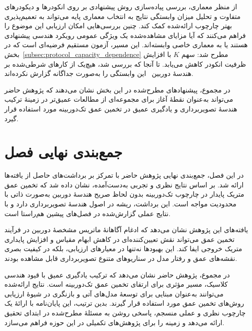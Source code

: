 از منظر معماری،
بررسی پیاده‌سازی روش پیشنهادی
بر روی انکودرها و دیکودرهای متفاوت
و تحلیل میزان وابستگی نتایج
به انتخاب معماری پایه
می‌تواند به تعمیم‌پذیری بهتر چارچوب ارائه‌شده کمک کند.
چنین بررسی‌هایی امکان ارزیابی این موضوع را فراهم می‌کنند
که آیا مزایای مشاهده‌شده
یک ویژگی عمومی رویکرد هندسی پیشنهادی هستند
یا به معماری خاصی وابسته‌اند.
این مسیر، آزمون مستقیم فرضیه‌ای است که در
بخش~\ref{subsec:protocol_capacity_dependence} مطرح شد:
سهم $K$ با افزایش ظرفیت انکودر کاهش می‌یابد.
تا آنجا که بررسی شد، هیچ‌یک از کارهای شرطی‌شده بر هندسهٔ
دوربین~\cite{Facil2019CAMConvs,Yin2023Metric3D,Piccinelli2024UniDepth}
این وابستگی را به‌صورت جداگانه گزارش نکرده‌اند.

در مجموع،
پیشنهادهای مطرح‌شده در این بخش
نشان می‌دهند که
پژوهش حاضر می‌تواند
به‌عنوان نقطهٔ آغاز
برای مجموعه‌ای از مطالعات عمیق‌تر
در زمینهٔ ترکیب هندسهٔ تصویربرداری
و یادگیری عمیق در تخمین عمق تک‌دوربینه
مورد استفاده قرار گیرد.

\section{جمع‌بندی نهایی فصل}
\label{sec:chapter5_final_summary}

در این فصل، جمع‌بندی نهایی پژوهش حاضر
با تمرکز بر برداشت‌های حاصل از یافته‌ها ارائه شد.
بر اساس نتایج نظری و تجربی به‌دست‌آمده،
نشان داده شد که
تخمین عمق متریک پایدار در چارچوب تک‌دوربینه
بدون لحاظ صریح هندسهٔ دوربین
به‌صورت ذاتی با محدودیت مواجه است.
این برداشت،
ریشه در اصول هندسهٔ تصویربرداری دارد
و با نتایج عملی گزارش‌شده در فصل‌های پیشین
هم‌راستا است.

یافته‌های این پژوهش نشان می‌دهد که
ادغام آگاهانهٔ ماتریس مشخصهٔ دوربین
در فرآیند تخمین عمق
می‌تواند نقش تعیین‌کننده‌ای
در کاهش ابهام مقیاس
و افزایش پایداری متریک خروجی ایفا کند.
این بهبودها نه‌تنها در معیارهای ارزیابی،
بلکه در کیفیت بصری نقشه‌های عمق
و رفتار مدل در سناریوهای متنوع تصویربرداری
قابل مشاهده بودند.

در مجموع،
پژوهش حاضر نشان می‌دهد که
ترکیب یادگیری عمیق با قیود هندسی کلاسیک،
مسیر مؤثری برای ارتقای تخمین عمق تک‌دوربینه است.
نتایج ارائه‌شده
می‌توانند به‌عنوان مبنایی
برای توسعهٔ مدل‌های آتی
و بازنگری در شیوهٔ ارزیابی
روش‌های تخمین عمق مورد استفاده قرار گیرند.
بدین ترتیب،
این پایان‌نامه با ارائهٔ یک چارچوب
نظری و عملی منسجم،
پاسخی روشن به مسئلهٔ مطرح‌شده در ابتدای تحقیق ارائه می‌دهد
و زمینه را برای پژوهش‌های تکمیلی
در این حوزه فراهم می‌سازد.
